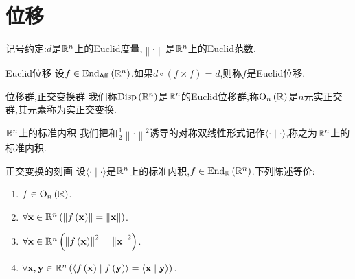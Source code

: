 \section{位移}

记号约定:$d$是$\mathbb{R}^{n}$上的Euclid度量,$\left\|\cdot\right\|$是$\mathbb{R}^{n}$上的Euclid范数.

\begin{definition}{Euclid位移}{}
	设$f\in\operatorname{End}_{\mathsf{Aff}}\left(\mathbb{R}^{n}\right)$.如果$d\circ\left(f\times f\right)=d$,则称$f$是Euclid位移.
\end{definition}

\begin{definition}{位移群,正交变换群}{}
	我们称$\operatorname{Disp}\left(\mathbb{R}^{n}\right)$是$\mathbb{R}^{n}$的Euclid位移群,称$\mathrm{O}_{n}\left(\mathbb{R}\right)$是$n$元实正交群,其元素称为实正交变换.
\end{definition}

\begin{definition}{$\mathbb{R}^{n}$上的标准内积}{}
	我们把和$\frac{1}{2}\left\|\cdot\right\|^{2}$诱导的对称双线性形式记作$\langle\cdot\mid\cdot\rangle$,称之为$\mathbb{R}^{n}$上的标准内积.
\end{definition}

\begin{proposition}{正交变换的刻画}{}
	设$\langle\cdot\mid\cdot\rangle$是$\mathbb{R}^{n}$上的标准内积,$f\in\operatorname{End}_{\mathbb{R}}\left(\mathbb{R}^{n}\right)$.下列陈述等价:
	\begin{enumerate}
		\item $f\in\mathrm{O}_{n}\left(\mathbb{R}\right)$.
		\item $\forall\mathbf{x}\in\mathbb{R}^{n}\left(\left\|f\left(\mathbf{x}\right)\right\|=\left\|\mathbf{x}\right\|\right)$.
		\item $\forall\mathbf{x}\in\mathbb{R}^{n}\left(\left\|f\left(\mathbf{x}\right)\right\|^{2}=\left\|\mathbf{x}\right\|^{2}\right)$.
		\item $\forall\mathbf{x},\mathbf{y}\in\mathbb{R}^{n}\left(\langle f\left(\mathbf{x}\right)\mid f\left(\mathbf{y}\right)\rangle=\langle\mathbf{x}\mid\mathbf{y}\rangle\right)$.
	\end{enumerate}
\end{proposition}